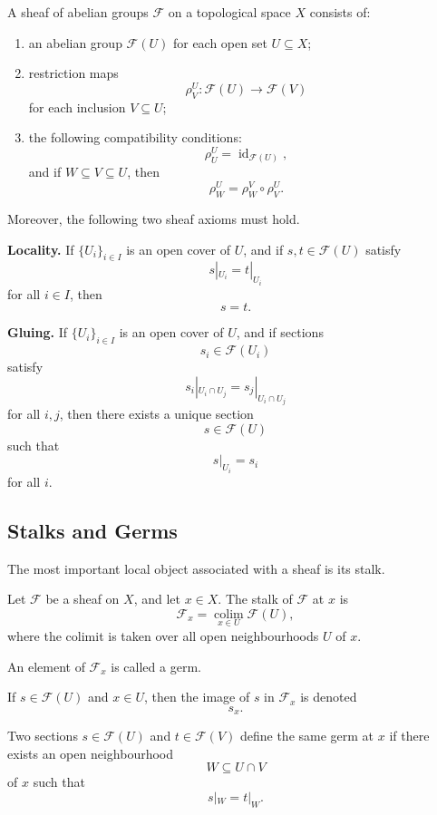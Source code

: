 \begin{definition}
	A sheaf of abelian groups \(\mathcal{F}\) on a topological space \(X\) consists of:
	\begin{enumerate}[label=\textup{(\roman*)}]
		\item an abelian group \(\mathcal{F}(U)\) for each open set \(U\subseteq X\);
		\item restriction maps
		\[
		\rho^U_V:\mathcal{F}(U)\to \mathcal{F}(V)
		\]
		for each inclusion \(V\subseteq U\);
		\item the following compatibility conditions:
		\[
		\rho^U_U=\operatorname{id}_{\mathcal{F}(U)},
		\]
		and if \(W\subseteq V\subseteq U\), then
		\[
		\rho^U_W=\rho^V_W\circ \rho^U_V.
		\]
	\end{enumerate}
	Moreover, the following two sheaf axioms must hold.
	
	\textbf{Locality.} If \(\{U_i\}_{i\in I}\) is an open cover of \(U\), and if \(s,t\in \mathcal{F}(U)\) satisfy
	\[
	s|_{U_i}=t|_{U_i}
	\]
	for all \(i\in I\), then
	\[
	s=t.
	\]
	
	\textbf{Gluing.} If \(\{U_i\}_{i\in I}\) is an open cover of \(U\), and if sections
	\[
	s_i\in \mathcal{F}(U_i)
	\]
	satisfy
	\[
	s_i|_{U_i\cap U_j}=s_j|_{U_i\cap U_j}
	\]
	for all \(i,j\), then there exists a unique section
	\[
	s\in \mathcal{F}(U)
	\]
	such that
	\[
	s|_{U_i}=s_i
	\]
	for all \(i\).
\end{definition}

\subsection{Stalks and Germs}

The most important local object associated with a sheaf is its stalk.

\begin{definition}[Stalk]
	Let \(\mathcal{F}\) be a sheaf on \(X\), and let \(x\in X\). The stalk of \(\mathcal{F}\) at \(x\) is
	\[
	\mathcal{F}_x=\operatorname*{colim}_{x\in U}\mathcal{F}(U),
	\]
	where the colimit is taken over all open neighbourhoods \(U\) of \(x\).
\end{definition}

An element of \(\mathcal{F}_x\) is called a germ.

If \(s\in \mathcal{F}(U)\) and \(x\in U\), then the image of \(s\) in \(\mathcal{F}_x\) is denoted
\[
s_x.
\]

Two sections \(s\in \mathcal{F}(U)\) and \(t\in \mathcal{F}(V)\) define the same germ at \(x\) if there exists an open neighbourhood
\[
W\subseteq U\cap V
\]
of \(x\) such that
\[
s|_W=t|_W.
\]

